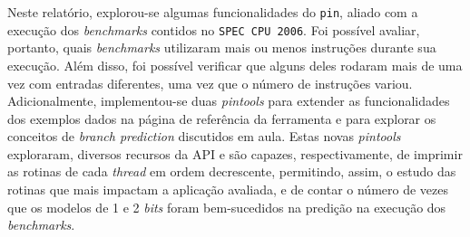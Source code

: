 \documentclass[12pt]{article}
\begin{document}
Neste relatório, explorou-se algumas funcionalidades do \texttt{pin}, aliado
com a execução dos \textit{benchmarks} contidos no \texttt{SPEC CPU 2006}. Foi
possível avaliar, portanto, quais \textit{benchmarks} utilizaram mais
ou menos instruções durante sua execução. Além disso, foi possível verificar
que alguns deles rodaram mais de uma vez com entradas diferentes, uma vez que o número de
instruções variou. Adicionalmente, implementou-se duas \textit{pintools} para
extender as funcionalidades dos exemplos dados na página de referência da ferramenta e para
explorar os conceitos de \textit{branch prediction} discutidos em aula.
Estas novas \textit{pintools} exploraram, diversos recursos da API e são
capazes, respectivamente, de imprimir as rotinas de cada \textit{thread} em ordem
decrescente, permitindo, assim, o estudo das rotinas que mais impactam a aplicação
avaliada, e de contar o número de vezes que os modelos de 1 e 2 \textit{bits}
foram bem-sucedidos na predição na execução dos \textit{benchmarks}.




\end{document}
